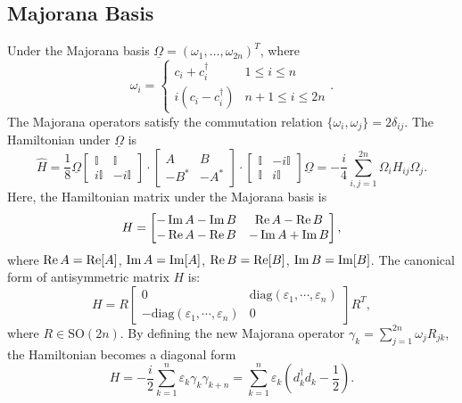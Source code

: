 \documentclass{SciPost}
\begin{document}
\subsection{Majorana Basis}
Under the Majorana basis $\underline\Omega=(\omega_1,\dots,\omega_{2n})^T$, where
\begin{equation}
	\omega_i = \begin{cases}
		c_i + c_i^\dagger & 1 \le i \le n \\
		i(c_i-c_i^\dagger) & n+1 \le i \le 2n
	\end{cases}.
\end{equation}
The Majorana operators satisfy the commutation relation $\{\omega_i,\omega_j\} = 2\delta_{ij}$.
The Hamiltonian under $\underline\Omega$ is
\begin{equation}
	\hat H = \frac{1}{8} \underline\Omega 
	\begin{bmatrix}
		\mathbb{I} & \mathbb{I} \\ i\mathbb{I} & -i\mathbb{I}
	\end{bmatrix}\cdot
	\begin{bmatrix}
		A & B \\ -B^* & -A^*
	\end{bmatrix}\cdot
	\begin{bmatrix}
		\mathbb{I} & -i\mathbb{I} \\ \mathbb{I} & i\mathbb{I}
	\end{bmatrix}
	\underline\Omega 
	= -\frac{i}{4} \sum_{i,j=1}^{2n} \Omega_i H_{ij} \Omega_j.
\end{equation}
Here, the Hamiltonian matrix under the Majorana basis is
\begin{equation}
	H = \begin{bmatrix}
		-\operatorname{Im}{A} - \operatorname{Im}{B} & \operatorname{Re}{A} - \operatorname{Re}{B} \\
    	-\operatorname{Re}{A} - \operatorname{Re}{B} &  -\operatorname{Im}{A} + \operatorname{Im}{B}
	\end{bmatrix},
\end{equation}
where $\operatorname{Re}{A} = \mathrm{Re}[A]$, $\operatorname{Im}{A} = \mathrm{Im}[A]$, $\operatorname{Re}{B} = \mathrm{Re}[B]$, $\operatorname{Im}{B} = \mathrm{Im}[B]$. 
The canonical form of antisymmetric matrix $H$ is:
\begin{equation}
	H = R \begin{bmatrix}
		0 & \mathrm{diag}(\varepsilon_1,\cdots,\varepsilon_n) \\ 
		-\mathrm{diag}(\varepsilon_1,\cdots,\varepsilon_n) & 0
	\end{bmatrix} R^T,
\end{equation}
where $R \in \mathrm{SO}(2n)$.
By defining the new Majorana operator $\gamma_k = \sum_{j=1}^{2n} \omega_j R_{jk}$, the Hamiltonian becomes a diagonal form
\begin{equation}
	H = -\frac{i}{2} \sum_{k=1}^n \varepsilon_k \gamma_k\gamma_{k+n}
	= \sum_{k=1}^n \varepsilon_k \left(d_k^\dagger d_k -\frac{1}{2}\right).
\end{equation}
\end{document}
